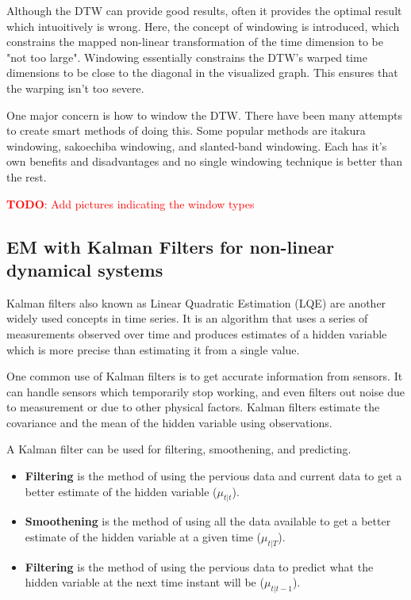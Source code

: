 \documentclass[hidelinks,BTech]{iitmdiss}
\newcommand\todo[1]{\textcolor{red}{{\bf TODO}: #1}}
\begin{document}
Although the DTW can provide good results, often it provides the optimal result which intuoitively is wrong. Here, the concept of windowing is introduced, which constrains the mapped non-linear transformation of the time dimension to be "not too large". Windowing essentially constrains the DTW's warped time dimensions to be close to the diagonal in the visualized graph. This ensures that the warping isn't too severe.

One major concern is how to window the DTW. There have been many attempts to create smart methods of doing this. Some popular methods are itakura windowing, sakoechiba windowing, and slanted-band windowing. Each has it's own benefits and disadvantages and no single windowing technique is better than the rest.

\todo{Add pictures indicating the window types}

\subsection{EM with Kalman Filters for non-linear dynamical systems}

Kalman filters \cite{KalmanFilters} also known as Linear Quadratic Estimation (LQE) are another widely used concepts in time series. It is an algorithm that uses a series of measurements observed over time and produces estimates of a hidden variable which is more precise than estimating it from a single value.

One common use of Kalman filters is to get accurate information from sensors. It can handle sensors which temporarily stop working, and even filters out noise due to measurement or due to other physical factors. Kalman filters estimate the covariance and the mean of the hidden variable using observations.

A Kalman filter can be used for filtering, smoothening, and predicting.
\begin{itemize}
\item{{\bf Filtering} is the method of using the pervious data and current data to get a better estimate of the hidden variable ($\mu_{t|t}$).}
\item{{\bf Smoothening} is the method of using all the data available to get a better estimate of the hidden variable at a given time ($\mu_{t|T}$).}
\item{{\bf Filtering} is the method of using the pervious data to predict what the hidden variable at the next time instant will be ($\mu_{t|t-1}$).}
\end{itemize}
\end{document}
